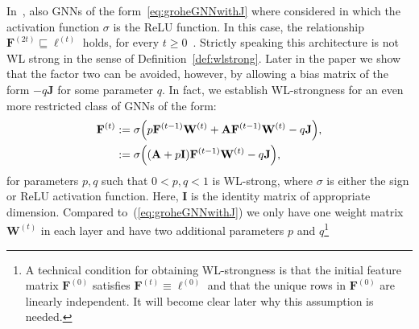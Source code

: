In~\cite{grohewl}, also GNNs of the form~\ref{eq:groheGNNwithJ} where considered in which the activation function $\sigma$ is the ReLU function. In this case, the relationship
$\mathbf{F}^{(2t)}\sqsubseteq \pmb{\ell}^{(t)}$ holds, for every $t\geq 0$~\cite{grohewl}.
Strictly speaking this architecture is not WL strong in the sense of Definition~\ref{def:wlstrong}. Later in the paper we show that the factor two can be avoided, however, by allowing a bias matrix of the form $-q\mathbf{J}$ for some parameter $q$.
In fact, we establish WL-strongness for
an even more restricted class of GNNs of the form:
\begin{align}
\mathbf{F}^{(t)}&:=\sigma\Bigl(p\mathbf{F}^{(t-1)}\mathbf{W}^{(t)}+ \mathbf{A}\mathbf{F}^{(t-1)}\mathbf{W}^{(t)} - q\mathbf{J}\Bigr), \label{eq:GNN}\\
&:=\sigma\Bigl((\mathbf{A}+p\mathbf{I})\mathbf{F}^{(t-1)}\mathbf{W}^{(t)} - q\mathbf{J}\Bigr), \label{eq:GNN2}
\end{align}
for parameters $p, q$ such that $0< p,q<1$ is WL-strong, where $\sigma$ is either the sign or ReLU activation function. Here, $\mathbf{I}$ is the identity matrix of appropriate dimension.
Compared to~(\ref{eq:groheGNNwithJ}) we only have one weight matrix $\mathbf{W}^{(t)}$ in each layer and have two additional parameters $p$ and $q$\footnote{A technical condition for obtaining WL-strongness is that  the initial feature matrix $\mathbf{F}^{(0)}$ satisfies $\mathbf{F}^{(t)}\equiv \pmb{\ell}^{(0)}$  and that
the unique rows in $\mathbf{F}^{(0)}$ are linearly independent. It will become clear later why this assumption is needed.}



%




